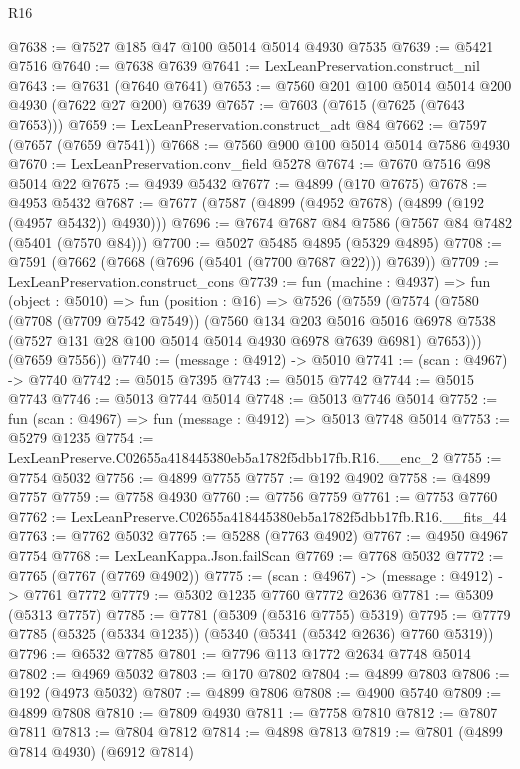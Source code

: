 \begin{lexlean}{R16}
\begin{coremodule}
@7638 := @7527 @185 @47 @100 @5014 @5014 @4930 @7535
@7639 := @5421 @7516
@7640 := @7638 @7639
@7641 := LexLeanPreservation.construct_nil
@7643 := @7631 (@7640 @7641)
@7653 := @7560 @201 @100 @5014 @5014 @200 @4930 (@7622 @27 @200) @7639
@7657 := @7603 (@7615 (@7625 (@7643 @7653)))
@7659 := LexLeanPreservation.construct_adt @84
@7662 := @7597 (@7657 (@7659 @7541))
@7668 := @7560 @900 @100 @5014 @5014 @7586 @4930
@7670 := LexLeanPreservation.conv_field @5278
@7674 := @7670 @7516 @98 @5014 @22
@7675 := @4939 @5432
@7677 := @4899 (@170 @7675)
@7678 := @4953 @5432
@7687 := @7677 (@7587 (@4899 (@4952 @7678) (@4899 (@192 (@4957 @5432)) @4930)))
@7696 := @7674 @7687 @84 @7586 (@7567 @84 @7482 (@5401 (@7570 @84)))
@7700 := @5027 @5485 @4895 (@5329 @4895)
@7708 := @7591 (@7662 (@7668 (@7696 (@5401 (@7700 @7687 @22))) @7639))
@7709 := LexLeanPreservation.construct_cons
@7739 := fun (machine : @4937) =>
  fun (object : @5010) =>
  fun (position : @16) =>
  @7526
    (@7559
      (@7574
        (@7580
          (@7708 (@7709 @7542 @7549))
          (@7560
            @134
            @203
            @5016
            @5016
            @6978
            @7538
            (@7527 @131 @28 @100 @5014 @5014 @4930 @6978 @7639 @6981)
            @7653)))
      (@7659 @7556))
@7740 := (message : @4912) -> @5010
@7741 := (scan : @4967) -> @7740
@7742 := @5015 @7395
@7743 := @5015 @7742
@7744 := @5015 @7743
@7746 := @5013 @7744 @5014
@7748 := @5013 @7746 @5014
@7752 := fun (scan : @4967) => fun (message : @4912) => @5013 @7748 @5014
@7753 := @5279 @1235
@7754 := LexLeanPreserve.C02655a418445380eb5a1782f5dbb17fb.R16.__enc_2
@7755 := @7754 @5032
@7756 := @4899 @7755
@7757 := @192 @4902
@7758 := @4899 @7757
@7759 := @7758 @4930
@7760 := @7756 @7759
@7761 := @7753 @7760
@7762 := LexLeanPreserve.C02655a418445380eb5a1782f5dbb17fb.R16.__fits_44
@7763 := @7762 @5032
@7765 := @5288 (@7763 @4902)
@7767 := @4950 @4967 @7754
@7768 := LexLeanKappa.Json.failScan
@7769 := @7768 @5032
@7772 := @7765 (@7767 (@7769 @4902))
@7775 := (scan : @4967) -> (message : @4912) -> @7761 @7772
@7779 := @5302 @1235 @7760 @7772 @2636
@7781 := @5309 (@5313 @7757)
@7785 := @7781 (@5309 (@5316 @7755) @5319)
@7795 := @7779 @7785 (@5325 (@5334 @1235)) (@5340 (@5341 (@5342 @2636) @7760 @5319))
@7796 := @6532 @7785
@7801 := @7796 @113 @1772 @2634 @7748 @5014
@7802 := @4969 @5032
@7803 := @170 @7802
@7804 := @4899 @7803
@7806 := @192 (@4973 @5032)
@7807 := @4899 @7806
@7808 := @4900 @5740
@7809 := @4899 @7808
@7810 := @7809 @4930
@7811 := @7758 @7810
@7812 := @7807 @7811
@7813 := @7804 @7812
@7814 := @4898 @7813
@7819 := @7801 (@4899 @7814 @4930) (@6912 @7814)

\end{coremodule}
\end{lexlean}
